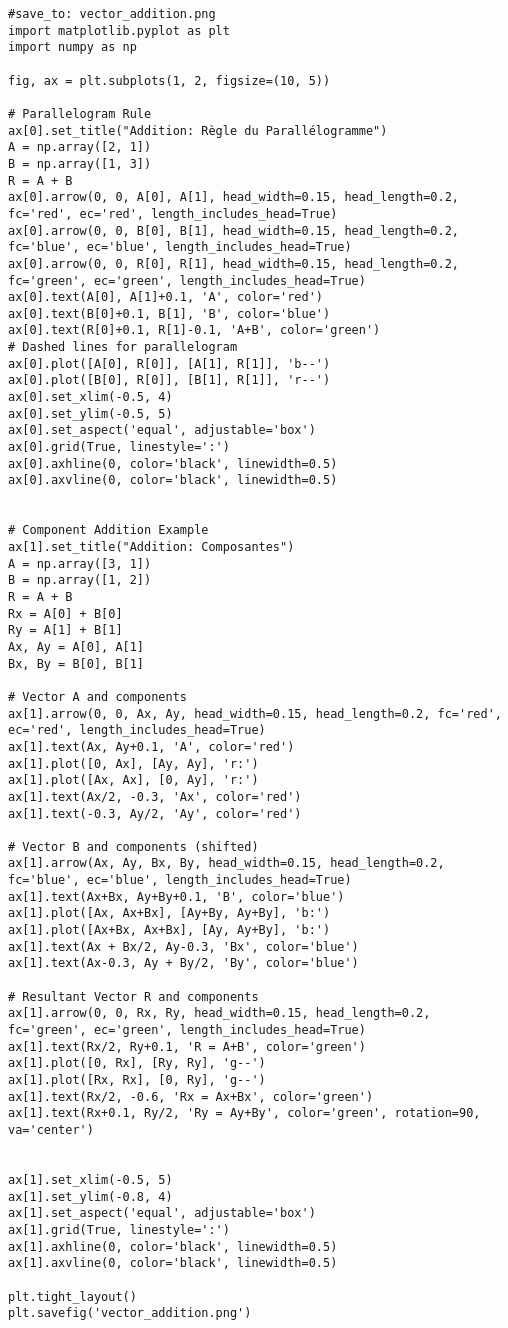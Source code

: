 \documentclass{article}
\begin{document}
\begin{verbatim}
#save_to: vector_addition.png
import matplotlib.pyplot as plt
import numpy as np

fig, ax = plt.subplots(1, 2, figsize=(10, 5))

# Parallelogram Rule
ax[0].set_title("Addition: Règle du Parallélogramme")
A = np.array([2, 1])
B = np.array([1, 3])
R = A + B
ax[0].arrow(0, 0, A[0], A[1], head_width=0.15, head_length=0.2, fc='red', ec='red', length_includes_head=True)
ax[0].arrow(0, 0, B[0], B[1], head_width=0.15, head_length=0.2, fc='blue', ec='blue', length_includes_head=True)
ax[0].arrow(0, 0, R[0], R[1], head_width=0.15, head_length=0.2, fc='green', ec='green', length_includes_head=True)
ax[0].text(A[0], A[1]+0.1, 'A', color='red')
ax[0].text(B[0]+0.1, B[1], 'B', color='blue')
ax[0].text(R[0]+0.1, R[1]-0.1, 'A+B', color='green')
# Dashed lines for parallelogram
ax[0].plot([A[0], R[0]], [A[1], R[1]], 'b--')
ax[0].plot([B[0], R[0]], [B[1], R[1]], 'r--')
ax[0].set_xlim(-0.5, 4)
ax[0].set_ylim(-0.5, 5)
ax[0].set_aspect('equal', adjustable='box')
ax[0].grid(True, linestyle=':')
ax[0].axhline(0, color='black', linewidth=0.5)
ax[0].axvline(0, color='black', linewidth=0.5)


# Component Addition Example
ax[1].set_title("Addition: Composantes")
A = np.array([3, 1])
B = np.array([1, 2])
R = A + B
Rx = A[0] + B[0]
Ry = A[1] + B[1]
Ax, Ay = A[0], A[1]
Bx, By = B[0], B[1]

# Vector A and components
ax[1].arrow(0, 0, Ax, Ay, head_width=0.15, head_length=0.2, fc='red', ec='red', length_includes_head=True)
ax[1].text(Ax, Ay+0.1, 'A', color='red')
ax[1].plot([0, Ax], [Ay, Ay], 'r:')
ax[1].plot([Ax, Ax], [0, Ay], 'r:')
ax[1].text(Ax/2, -0.3, 'Ax', color='red')
ax[1].text(-0.3, Ay/2, 'Ay', color='red')

# Vector B and components (shifted)
ax[1].arrow(Ax, Ay, Bx, By, head_width=0.15, head_length=0.2, fc='blue', ec='blue', length_includes_head=True)
ax[1].text(Ax+Bx, Ay+By+0.1, 'B', color='blue')
ax[1].plot([Ax, Ax+Bx], [Ay+By, Ay+By], 'b:')
ax[1].plot([Ax+Bx, Ax+Bx], [Ay, Ay+By], 'b:')
ax[1].text(Ax + Bx/2, Ay-0.3, 'Bx', color='blue')
ax[1].text(Ax-0.3, Ay + By/2, 'By', color='blue')

# Resultant Vector R and components
ax[1].arrow(0, 0, Rx, Ry, head_width=0.15, head_length=0.2, fc='green', ec='green', length_includes_head=True)
ax[1].text(Rx/2, Ry+0.1, 'R = A+B', color='green')
ax[1].plot([0, Rx], [Ry, Ry], 'g--')
ax[1].plot([Rx, Rx], [0, Ry], 'g--')
ax[1].text(Rx/2, -0.6, 'Rx = Ax+Bx', color='green')
ax[1].text(Rx+0.1, Ry/2, 'Ry = Ay+By', color='green', rotation=90, va='center')


ax[1].set_xlim(-0.5, 5)
ax[1].set_ylim(-0.8, 4)
ax[1].set_aspect('equal', adjustable='box')
ax[1].grid(True, linestyle=':')
ax[1].axhline(0, color='black', linewidth=0.5)
ax[1].axvline(0, color='black', linewidth=0.5)

plt.tight_layout()
plt.savefig('vector_addition.png')
\end{verbatim}
\end{document}
